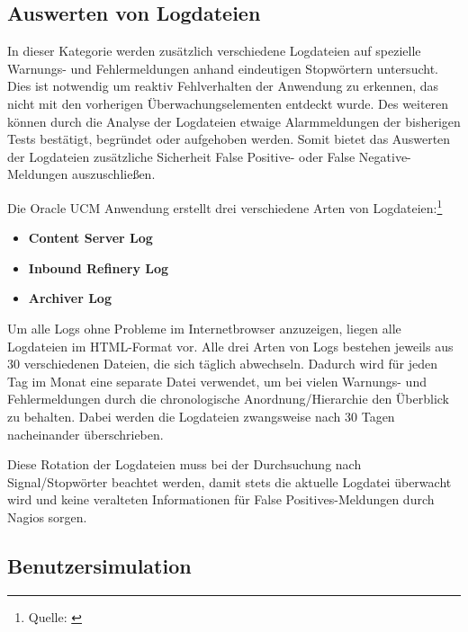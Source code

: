 \subsection{Auswerten von Logdateien}
\label{checklog}
In dieser Kategorie werden zusätzlich verschiedene Logdateien auf spezielle Warnungs- und Fehlermeldungen anhand eindeutigen Stopwörtern untersucht.
Dies ist notwendig um reaktiv Fehlverhalten der Anwendung zu erkennen, das nicht mit den vorherigen Überwachungselementen entdeckt wurde.
Des weiteren können durch die Analyse der Logdateien etwaige Alarmmeldungen der bisherigen Tests bestätigt, begründet oder aufgehoben werden.
Somit bietet das Auswerten der Logdateien zusätzliche Sicherheit False Positive- oder False Negative-Meldungen auszuschließen.

Die Oracle UCM Anwendung erstellt drei verschiedene Arten von Logdateien:\footnote{Quelle: \cite{UCMlog09}}

\begin{itemize}
\item \textbf{Content Server Log} 
\item \textbf{Inbound Refinery Log}
\item \textbf{Archiver Log}
\end{itemize}

Um alle Logs ohne Probleme im Internetbrowser anzuzeigen, liegen alle Logdateien im HTML-Format vor.
Alle drei Arten von Logs bestehen jeweils aus 30 verschiedenen Dateien, die sich täglich abwechseln.
Dadurch wird für jeden Tag im Monat eine separate Datei verwendet, um bei vielen Warnungs- und Fehlermeldungen durch die chronologische Anordnung/Hierarchie den Überblick zu behalten.
Dabei werden die Logdateien zwangsweise nach 30 Tagen nacheinander überschrieben.

Diese Rotation der Logdateien muss bei der Durchsuchung nach Signal/Stopwörter beachtet werden, damit stets die aktuelle Logdatei überwacht wird und keine veralteten Informationen für False Positives-Meldungen durch Nagios sorgen.


\subsection{Benutzersimulation}

